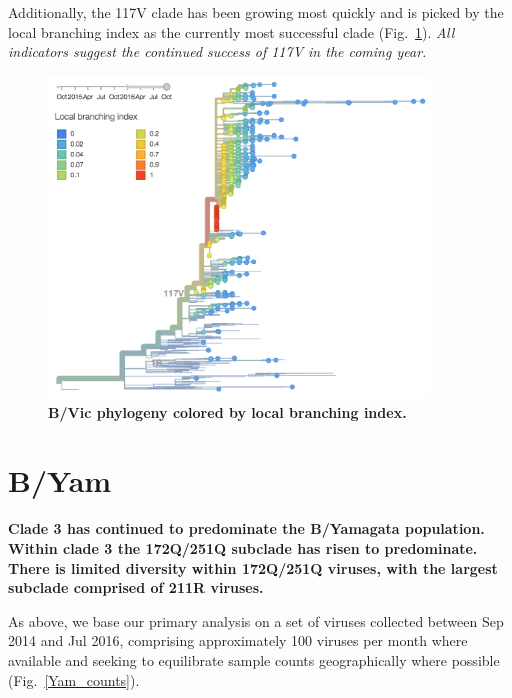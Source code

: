 \documentclass[11pt,oneside,letterpaper]{article}
\begin{document}
\pagebreak

Additionally, the 117V clade has been growing most quickly and is picked by the local branching index \cite{neher2014predicting} as the currently most successful clade (Fig.\ \ref{Vic_LBI}). \textit{All indicators suggest the continued success of 117V in the coming year.}

\begin{figure}[H]
	\centering
	\includegraphics[width=0.9\textwidth]{../figures/sep-2016/Vic_LBI.png}
	\caption{\textbf{B/Vic phylogeny colored by local branching index.}
	}
	\label{Vic_LBI}
\end{figure}

\clearpage
\pagebreak

\section*{B/Yam}

\textbf{Clade 3 has continued to predominate the B/Yamagata population. Within clade 3 the 172Q/251Q subclade has risen to predominate. There is limited diversity within 172Q/251Q viruses, with the largest subclade comprised of 211R viruses.}

As above, we base our primary analysis on a set of viruses collected between Sep 2014 and Jul 2016, comprising approximately 100 viruses per month where available and seeking to equilibrate sample counts geographically where possible (Fig.\ \ref{Yam_counts}).
\end{document}
